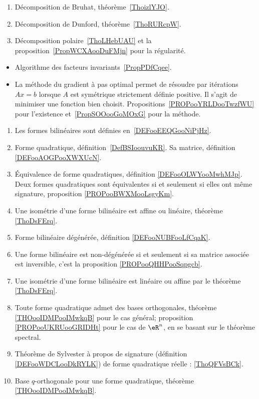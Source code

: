    \label{DECooWTAIooNkZAFg}
\begin{enumerate}
    \item
        Décomposition de Bruhat, théorème~\ref{ThoizlYJO}.
    \item
        Décomposition de Dunford, théorème~\ref{ThoRURcpW}.
    \item
        Décomposition polaire~\ref{ThoLHebUAU} et la proposition~\ref{PropWCXAooDuFMjn} pour la régularité.
\end{enumerate}


\begin{itemize}
    \item Algorithme des facteurs invariants~\ref{PropPDfCqee}.
    \item La méthode du gradient à pas optimal permet de résoudre par itérations \( Ax=b\) lorsque \( A\) est symétrique strictement définie positive. Il s'agit de minimiser une fonction bien choisit. Propositions~\ref{PROPooYRLDooTwzfWU} pour l'existence et~\ref{PropSOOooGoMOxG} pour la méthode.
\end{itemize}


      \label{THEMEooOAJKooEvcCVn}
    \begin{enumerate}
\item
    Les formes bilinéaires sont définies en~\ref{DEFooEEQGooNiPjHz}.
\item
    Forme quadratique, définition~\ref{DefBSIoouvuKR}. Sa matrice, définition \ref{DEFooAOGPooXWXUcN}.
\item
    Équivalence de forme quadratiques, définition \ref{DEFooOLWYooMwhMJp}. Deux formes quadratiques sont équivalentes si et seulement si elles ont même signature, proposition \ref{PROPooBWXMooLsgyKm}.
\item
    Une isométrie d'une forme bilinéaire est affine ou linéaire, théorème \ref{ThoDsFErq}.
\item
    Forme bilinéaire dégénérée, définition \ref{DEFooNUBFooLfCqaK}.
\item
    Une forme bilinéaire est non-dégénérée si et seulement si sa matrice associée est inversible, c'est la proposition \ref{PROPooQHHPooSqpgcb}.
\item
    Une isométrie d'une forme bilinéaire est linéaire ou affine par le théorème \ref{ThoDsFErq}.
\item
    Toute forme quadratique admet des bases orthogonales, théorème \ref{THOooIDMPooIMwkqB} pour le cas général; proposition \ref{PROPooUKRUooGRIDHt} pour le cas de \( \eR^n\), en se basant sur le théorème spectral.
\item
    Théorème de Sylvester à propos de signature (définition \ref{DEFooWDCLooDkRYLK}) de forme quadratique réelle : \ref{ThoQFVsBCk}.
\item
    Base \( q\)-orthogonale pour une forme quadratique, théorème \ref{THOooIDMPooIMwkqB}.
\end{enumerate}

